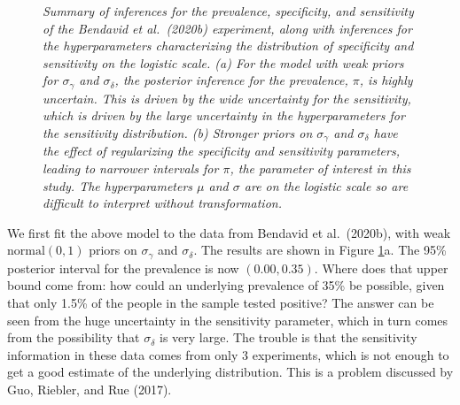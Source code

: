 \documentclass[11pt]{article}
\begin{document}
\begin{figure}
  \caption{\em Summary of inferences for the prevalence, specificity, and sensitivity of the Bendavid et al.\ (2020b) experiment, along with inferences for the hyperparameters characterizing the distribution of specificity and sensitivity on the logistic scale.  (a) For the model with weak priors for $\sigma_{\gamma}$ and $\sigma_{\delta}$, the posterior inference for the prevalence, $\pi$, is highly uncertain.  This is driven by the wide uncertainty for the sensitivity, which is driven by the large uncertainty in the hyperparameters for the sensitivity distribution. (b) Stronger priors on  $\sigma_{\gamma}$ and $\sigma_{\delta}$ have the effect of regularizing the specificity and sensitivity parameters, leading to narrower intervals for $\pi$, the parameter of interest in this study.  The hyperparameters $\mu$ and $\sigma$ are on the logistic scale so are difficult to interpret without transformation.}
\label{posterior2}
\end{figure}

We first fit the above model to the data from Bendavid et al.\ (2020b), with weak $\mbox{normal}(0,1)$ priors on $\sigma_{\gamma}$ and $\sigma_{\delta}$.  The results are shown in Figure \ref{posterior2}a.  The 95\% posterior interval for the prevalence is now $(0.00, 0.35)$.  Where does that upper bound come from:  how could an underlying prevalence of 35\% be possible, given that only 1.5\% of the people in the sample tested positive?  The answer can be seen from the huge uncertainty in the sensitivity parameter, which in turn comes from the possibility that $\sigma_{\delta}$ is very large.  The trouble is that the sensitivity information in these data comes from only 3 experiments, which is not enough to get a good estimate of the underlying distribution.  This is a problem discussed by Guo, Riebler, and Rue (2017).
\end{document}
